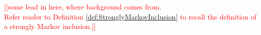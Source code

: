 \documentclass[11pt]{article}
\theoremstyle{plain}
\newtheorem{prop}[thm]{Proposition}
\theoremstyle{definition}
\newtheorem{defn}[thm]{Definition}
\DeclareMathOperator{\tr}{tr}
\newcommand{\dave}[1]{\marginpar{\tiny \textcolor{orange}{DP: #1}}}
\newcommand{\nn}[1]{\textcolor{red}{[[#1]]}}
\begin{document}
\nn{some lead in here, where background comes from.
\\
Refer reader to Definition \ref{def:StronglyMarkovInclusion} to recall the definition of a strongly Markov inclusion.}

%
%
%
%
%
\end{document}
